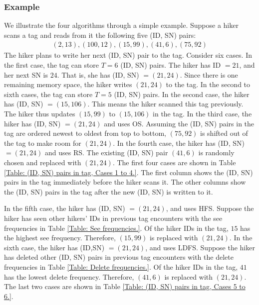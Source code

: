 \subsubsection{\textbf{Example}}
We illustrate the four algorithms through a simple example.  Suppose a hiker scans a tag and reads from it the following five (ID, SN) pairs:
\begin{eqnarray}
 (2, 13), (100, 12), (15, 99), (41, 6), (75, 92)
 \end{eqnarray}
The hiker plans to write her next (ID, SN) pair to the tag.  Consider six cases.  In the first case, the tag can store $T = 6$ (ID, SN) pairs. The hiker has ID $=21$, and her next SN is $24$. That is, she has (ID, SN) $=(21,24)$. Since there is one remaining memory space, the hiker writes $(21, 24)$ to the tag.  In the second to sixth cases, the tag can store $T = 5$ (ID, SN) pairs.  In the second case, the hiker has (ID, SN) $= (15, 106)$.  This means the hiker scanned this tag previously.  The hiker thus updates $(15, 99)$ to $(15, 106)$ in the tag.  In the third case, the hiker has (ID, SN) $= (21, 24)$ and uses OS.  Assuming the (ID, SN) pairs in the tag are ordered newest to oldest from top to bottom, $(75, 92)$ is shifted out of the tag to make room for $(21, 24)$.  In the fourth case, the hiker has (ID, SN) $=(21, 24)$ and uses RS.  The existing (ID, SN) pair $(41, 6)$ is randomly chosen and replaced with $(21, 24)$.  The first four cases are shown in Table \ref{Table: (ID, SN) pairs in tag, Cases 1 to 4.}.  The first column shows the (ID, SN) pairs in the tag immediately before the hiker scans it.  The other columns show the (ID, SN) pairs in the tag after the new (ID, SN) is written to it.

In the fifth case, the hiker has (ID, SN) $= (21, 24)$, and uses HFS.  Suppose the hiker has seen other hikers' IDs in previous tag encounters with the see frequencies in Table \ref{Table: See frequencies.}. Of the hiker IDs in the tag, $15$ has the highest see frequency.  Therefore, $(15, 99)$ is replaced with $(21, 24)$.  In the sixth case, the hiker has (ID,SN) $=(21, 24)$, and uses LDFS.  Suppose the hiker has deleted other (ID, SN) pairs in previous tag encounters with the delete frequencies in Table \ref{Table: Delete frequencies.}. Of the hiker IDs in the tag, $41$ has the lowest delete frequency.  Therefore, $(41, 6)$ is replaced with $(21, 24)$.  The last two cases are shown in Table \ref{Table: (ID, SN) pairs in tag, Cases 5 to 6.}.

